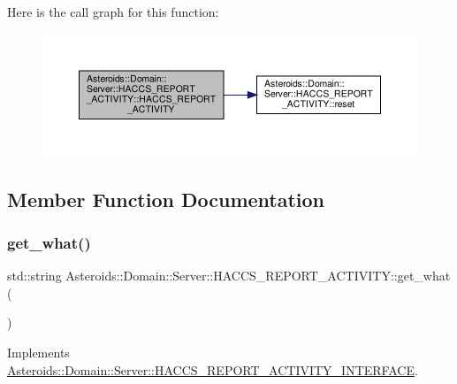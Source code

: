 Here is the call graph for this function\+:\nopagebreak
\begin{figure}[H]
\begin{center}
\leavevmode
\includegraphics[width=350pt]{classAsteroids_1_1Domain_1_1Server_1_1HACCS__REPORT__ACTIVITY_a843939501e175620371d01d53e708537_cgraph}
\end{center}
\end{figure}


\subsection{Member Function Documentation}
\mbox{\label{classAsteroids_1_1Domain_1_1Server_1_1HACCS__REPORT__ACTIVITY_a8f6d5b877337feefefaa85bf639166e9}} 
\subsubsection{\texorpdfstring{get\+\_\+what()}{get\_what()}}
{\footnotesize\ttfamily std\+::string Asteroids\+::\+Domain\+::\+Server\+::\+H\+A\+C\+C\+S\+\_\+\+R\+E\+P\+O\+R\+T\+\_\+\+A\+C\+T\+I\+V\+I\+T\+Y\+::get\+\_\+what (\begin{DoxyParamCaption}{ }\end{DoxyParamCaption})\hspace{0.3cm}{\ttfamily [virtual]}}



Implements \hyperlink{classAsteroids_1_1Domain_1_1Server_1_1HACCS__REPORT__ACTIVITY__INTERFACE_a53c41f99bd22445fd466543577a257cb}{Asteroids\+::\+Domain\+::\+Server\+::\+H\+A\+C\+C\+S\+\_\+\+R\+E\+P\+O\+R\+T\+\_\+\+A\+C\+T\+I\+V\+I\+T\+Y\+\_\+\+I\+N\+T\+E\+R\+F\+A\+CE}.



